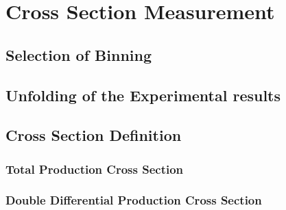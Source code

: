 \chapter{Cross Section Measurement}

\section{Selection of Binning}

\section{Unfolding of the Experimental results}

\section{Cross Section Definition}
\subsection{Total Production Cross Section}
\subsection{Double Differential Production Cross Section}

